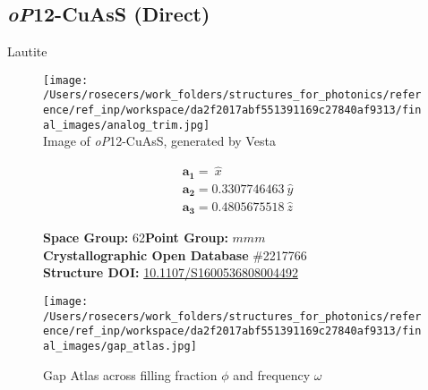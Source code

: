\subsection{\large{\textit{oP}12-CuAsS (Direct)}}\vspace{-0.1in}
Lautite


\begin{figure}[H]
\begin{minipage}{0.34\textwidth}\centering
\texttt{[image: /Users/rosecers/work\_folders/structures\_for\_photonics/reference/ref\_inp/workspace/da2f2017abf551391169c27840af9313/final\_images/analog\_trim.jpg]}\\
\small{Image of \textit{oP}12-CuAsS, generated by Vesta}
\end{minipage}\hfill
\begin{minipage}{0.65\textwidth}\raggedright
{\setlength{\mathindent}{0cm}
\begin{equation*}
\begin{split}&\boldsymbol{a_1} = \ \hat{x}\\[-8pt]
&\boldsymbol{a_2} = 0.3307746463\ \hat{y}\\[-8pt]
&\boldsymbol{a_3} = 0.4805675518\ \hat{z}
\end{split}
\end{equation*}}

\textbf{Space Group:}	62\hspace{0.5in}\textbf{Point Group:}	$mmm$\\
\textbf{Crystallographic Open Database} \#2217766\\
\textbf{Structure DOI: }\url{10.1107/S1600536808004492}

\end{minipage}\hfill
\end{figure}
\vspace{-0.25in}


\begin{figure}[H]
\begin{minipage}{0.9\textwidth}\centering
\texttt{[image: /Users/rosecers/work\_folders/structures\_for\_photonics/reference/ref\_inp/workspace/da2f2017abf551391169c27840af9313/final\_images/gap\_atlas.jpg]}
\\
\end{minipage}\hfill\caption{Gap Atlas across filling fraction $\phi$ and frequency $\omega$}
\end{figure}


